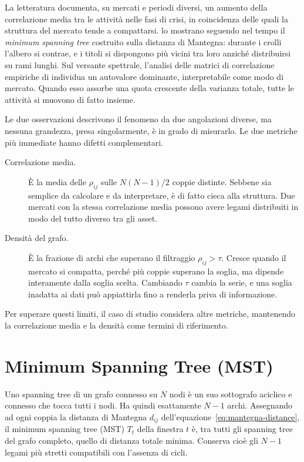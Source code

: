 La letteratura documenta, su mercati e periodi diversi, un aumento della correlazione media tra le attività nelle fasi di crisi, in coincidenza delle quali la struttura del mercato tende a compattarsi. \Textcite{onnela2003dynamics} lo mostrano seguendo nel tempo il \emph{minimum spanning tree} costruito sulla distanza di Mantegna: durante i crolli l'albero si contrae, e i titoli si dispongono più vicini tra loro anziché distribuirsi su rami lunghi. Sul versante spettrale, l'analisi delle matrici di correlazione empiriche di \textcite{laloux1999noise} individua un autovalore dominante, interpretabile come modo di mercato. Quando esso assorbe una quota crescente della varianza totale, tutte le attività si muovono di fatto insieme.

Le due osservazioni descrivono il fenomeno da due angolazioni diverse, ma nessuna grandezza, presa singolarmente, è in grado di misurarlo. Le due metriche più immediate hanno difetti complementari.

\begin{description}
    \item[Correlazione media.] È la media delle $\rho_{ij}$ sulle $N(N-1)/2$ coppie distinte. Sebbene sia semplice da calcolare e da interpretare, è di fatto cieca alla struttura. Due mercati con la stessa correlazione media possono avere legami distribuiti in modo del tutto diverso tra gli asset.
    \item[Densità del grafo.] È la frazione di archi che superano il filtraggio $\rho_{ij}>\tau$. Cresce quando il mercato si compatta, perché più coppie superano la soglia, ma dipende interamente dalla soglia scelta. Cambiando $\tau$ cambia la serie, e una soglia inadatta ai dati può appiattirla fino a renderla priva di informazione.
\end{description}

Per superare questi limiti, il caso di studio considera altre metriche, mantenendo la correlazione media e la densità come termini di riferimento.

\section{Minimum Spanning Tree (MST)}
\label{sec:topo-mst}

Uno spanning tree di un grafo connesso su $N$ nodi è un suo sottografo aciclico e connesso che tocca tutti i nodi. Ha quindi esattamente $N-1$ archi. Assegnando ad ogni coppia la distanza di Mantegna $d_{ij}$ dell'equazione~\eqref{eq:mantegna-distance}, il minimum spanning tree (MST) $T_t$ della finestra $t$ è, tra tutti gli spanning tree del grafo completo, quello di distanza totale minima. Conserva cioè gli $N-1$ legami più stretti compatibili con l'assenza di cicli.

